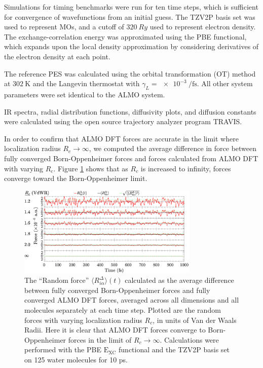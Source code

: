 \documentclass[10pt,aps,prl,twocolumn,amsmath,amssymb,superscriptaddress,longbibliography]{revtex4-1}
\begin{document}
Simulations for timing benchmarks were run for ten time steps, which is sufficient for convergence of wavefunctions from an initial guess.
The TZV2P basis set was used to represent MOs, and a cutoff of $\SI{320}{Ry}$ used to represent electron density. 
The exchange-correlation energy was approximated using the PBE functional, which expands upon the local density approximation by considering derivatives of the electron density at each point.~\cite{a:PBEfunctional} 

The reference PES was calculated using the orbital transformation (OT) method~\cite{a:ot,a:ot2} at $\SI{302}{\K}$ and the Langevin thermostat with $\gamma_L = \SI{e-3}{\per\fs}$. 
All other system parameters were set identical to the ALMO system.

IR spectra, radial distribution functions, diffusivity plots, and diffusion constants were calculated using the open source trajectory analyzer program TRAVIS.~\cite{a:travis-main,a:travis-ir1,a:travis-ir2}


In order to confirm that ALMO DFT forces are accurate in the limit where localization radius $R_{c} \rightarrow \infty$, we computed the average difference in force between fully converged Born-Oppenheimer forces and forces calculated from ALMO DFT with varying $R_{c}$. 
Figure \ref{fig:forcecomp} shows that as $R_{c}$ is increased to infinity, forces converge toward the Born-Oppenheimer limit.

\begin{figure}
\includegraphics[trim={0.1cm 0cm 0.2cm 0.1cm},clip,width=8.6cm]{DeltaForceComparison_ALMO_SCF.eps}
\caption{\label{fig:forcecomp}The ``Random force'' $\langle R^{\Delta}_{i\alpha} \rangle (t)$ calculated as the average difference between fully converged Born-Oppenheimer forces and fully converged ALMO DFT forces, averaged across all dimensions and all molecules separately at each time step. 
Plotted are the random forces with varying localization radius $R_{c}$, in units of Van der Waals Radii.
Here it is clear that ALMO DFT forces converge to Born-Oppenheimer forces in the limit of $R_{c} \rightarrow \infty$.
Calculations were performed with the PBE $\mathrm{E_{XC}}$ functional and the TZV2P basis set on 125 water molecules for 10 ps.}
\end{figure}
\end{document}
